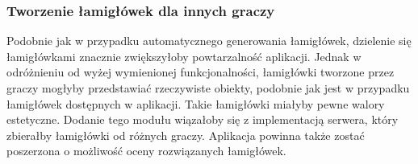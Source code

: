 \subsubsection{Tworzenie łamigłówek dla innych graczy}
    Podobnie jak w przypadku automatycznego generowania łamigłówek, dzielenie się łamigłówkami
znacznie zwiększyłoby powtarzalność aplikacji. Jednak w odróżnieniu od wyżej wymienionej funkcjonalności,
łamigłówki tworzone przez graczy mogłyby przedstawiać rzeczywiste obiekty, podobnie jak jest w przypadku
łamigłówek dostępnych w aplikacji. Takie łamigłówki miałyby pewne walory estetyczne. Dodanie
tego modułu wiązałoby się z implementacją serwera, który zbierałby łamigłówki od różnych graczy.
Aplikacja powinna także zostać poszerzona o możliwość oceny rozwiązanych łamigłówek.
